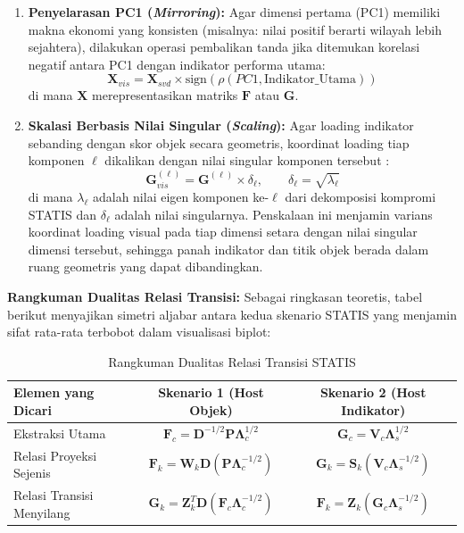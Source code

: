 \begin{enumerate}[label=\arabic*.]
    \begin{enumerate}[label=\alph*.]
        \item \textbf{Penyelarasan PC1 (\textit{Mirroring}):} Agar dimensi pertama (PC1) memiliki makna ekonomi yang konsisten (misalnya: nilai positif berarti wilayah lebih sejahtera), dilakukan operasi pembalikan tanda jika ditemukan korelasi negatif antara PC1 dengan indikator performa utama:
        \begin{equation}
            \mathbf{X}_{vis} = \mathbf{X}_{svd} \times \text{sign}(\rho(PC1, \text{Indikator\_Utama}))
        \end{equation}
        di mana $\mathbf{X}$ merepresentasikan matriks $\mathbf{F}$ atau $\mathbf{G}$.
        
        \item \textbf{Skalasi Berbasis Nilai Singular (\textit{Scaling}):} Agar loading indikator sebanding dengan skor objek secara geometris, koordinat loading tiap komponen $\ell$ dikalikan dengan nilai singular komponen tersebut \citep{abdi2012}:
        \begin{equation}\label{eq:skalasi_visual}
            \mathbf{G}_{vis}^{(\ell)} = \mathbf{G}^{(\ell)} \times \delta_\ell, \qquad \delta_\ell = \sqrt{\lambda_\ell}
        \end{equation}
        di mana $\lambda_\ell$ adalah nilai eigen komponen ke-$\ell$ dari dekomposisi kompromi STATIS dan $\delta_\ell$ adalah nilai singularnya. Penskalaan ini menjamin varians koordinat loading visual pada tiap dimensi setara dengan nilai singular dimensi tersebut, sehingga panah indikator dan titik objek berada dalam ruang geometris yang dapat dibandingkan.
    \end{enumerate}
\end{enumerate}

\noindent \textbf{Rangkuman Dualitas Relasi Transisi:} Sebagai ringkasan teoretis, tabel berikut menyajikan simetri aljabar antara kedua skenario STATIS yang menjamin sifat rata-rata terbobot dalam visualisasi biplot:

\begin{table}[H]
    \centering
    \caption{Rangkuman Dualitas Relasi Transisi STATIS}
    \label{tab:dualitas_statis}
    \small
    \begin{tabular}{|l|c|c|}
    \hline
    \textbf{Elemen yang Dicari} & \textbf{Skenario 1 (Host Objek)} & \textbf{Skenario 2 (Host Indikator)} \\ \hline
    Ekstraksi Utama & $\mathbf{F}_c = \mathbf{D}^{-1/2} \mathbf{P} \mathbf{\Lambda}_c^{1/2}$ & $\mathbf{G}_c = \mathbf{V}_c \mathbf{\Lambda}_s^{1/2}$ \\ \hline
    Relasi Proyeksi Sejenis & $\mathbf{F}_k = \mathbf{W}_k \mathbf{D} (\mathbf{P} \mathbf{\Lambda}_c^{-1/2})$ & $\mathbf{G}_k = \mathbf{S}_k (\mathbf{V}_c \mathbf{\Lambda}_s^{-1/2})$ \\ \hline
    Relasi Transisi Menyilang & $\mathbf{G}_k = \mathbf{Z}_k^T \mathbf{D} (\mathbf{F}_c \mathbf{\Lambda}_c^{-1/2})$ & $\mathbf{F}_k = \mathbf{Z}_k (\mathbf{G}_c \mathbf{\Lambda}_s^{-1/2})$ \\ \hline
    \end{tabular}
\end{table}


